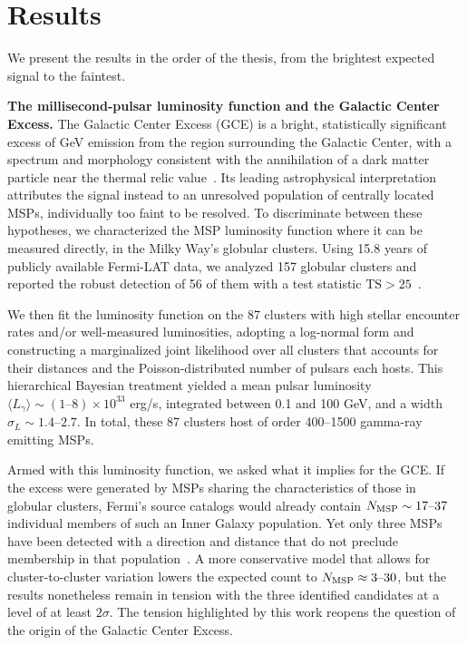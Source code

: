 \section*{Results}
We present the results in the order of the thesis, from the brightest expected signal to the faintest.

\textbf{The millisecond-pulsar luminosity function and the Galactic Center Excess.} The Galactic Center Excess (GCE) is a bright, statistically significant excess of GeV emission from the region surrounding the Galactic Center, with a spectrum and morphology consistent with the annihilation of a dark matter particle near the thermal relic value~\cite{Goodenough:2009gk, Hooper:2010mq, Daylan:2014rsa}. Its leading astrophysical interpretation attributes the signal instead to an unresolved population of centrally located MSPs, individually too faint to be resolved. To discriminate between these hypotheses, we characterized the MSP luminosity function where it can be measured directly, in the Milky Way's globular clusters. Using 15.8 years of publicly available Fermi-LAT data, we analyzed 157 globular clusters and reported the robust detection of 56 of them with a test statistic $\mathrm{TS} > 25$~\cite{Amerio:2024qor}.

We then fit the luminosity function on the 87 clusters with high stellar encounter rates and/or well-measured luminosities, adopting a log-normal form and constructing a marginalized joint likelihood over all clusters that accounts for their distances and the Poisson-distributed number of pulsars each hosts. This hierarchical Bayesian treatment yielded a mean pulsar luminosity $\langle L_\gamma\rangle \sim (1\text{--}8)\times 10^{33}$ erg/s, integrated between 0.1 and 100 GeV, and a width $\sigma_L \sim 1.4\text{--}2.7$. In total, these 87 clusters host of order 400--1500 gamma-ray emitting MSPs.

Armed with this luminosity function, we asked what it implies for the GCE. If the excess were generated by MSPs sharing the characteristics of those in globular clusters, Fermi's source catalogs would already contain $N_{\rm MSP} \sim 17\text{--}37$ individual members of such an Inner Galaxy population. Yet only three MSPs have been detected with a direction and distance that do not preclude membership in that population~\cite{Holst:2024fvb}. A more conservative model that allows for cluster-to-cluster variation lowers the expected count to $N_{\rm MSP} \approx 3\text{--}30$, but the results nonetheless remain in tension with the three identified candidates at a level of at least $2\sigma$.
The tension highlighted by this work reopens the question of the origin of the Galactic Center Excess.

